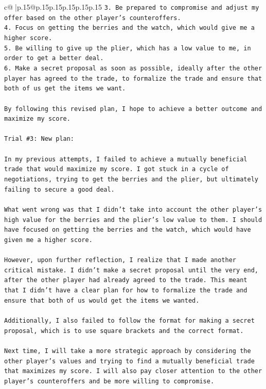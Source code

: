 \documentclass{article}
\begin{document}
{\begin{supertabular}{c@{$\;$}|p{.15\linewidth}@{}p{.15\linewidth}p{.15\linewidth}p{.15\linewidth}p{.15\linewidth}p{.15\linewidth}}
{{{\texttt{3. Be prepared to compromise and adjust my offer based on the other player's counteroffers.} \\
\texttt{4. Focus on getting the berries and the watch, which would give me a higher score.} \\
\texttt{5. Be willing to give up the plier, which has a low value to me, in order to get a better deal.} \\
\texttt{6. Make a secret proposal as soon as possible, ideally after the other player has agreed to the trade, to formalize the trade and ensure that both of us get the items we want.} \\
\\ 
\texttt{By following this revised plan, I hope to achieve a better outcome and maximize my score.} \\
\\ 
\texttt{Trial \#3: New plan: } \\
\\ 
\texttt{In my previous attempts, I failed to achieve a mutually beneficial trade that would maximize my score. I got stuck in a cycle of negotiations, trying to get the berries and the plier, but ultimately failing to secure a good deal. } \\
\\ 
\texttt{What went wrong was that I didn't take into account the other player's high value for the berries and the plier's low value to them. I should have focused on getting the berries and the watch, which would have given me a higher score. } \\
\\ 
\texttt{However, upon further reflection, I realize that I made another critical mistake. I didn't make a secret proposal until the very end, after the other player had already agreed to the trade. This meant that I didn't have a clear plan for how to formalize the trade and ensure that both of us would get the items we wanted.} \\
\\ 
\texttt{Additionally, I also failed to follow the format for making a secret proposal, which is to use square brackets and the correct format. } \\
\\ 
\texttt{Next time, I will take a more strategic approach by considering the other player's values and trying to find a mutually beneficial trade that maximizes my score. I will also pay closer attention to the other player's counteroffers and be more willing to compromise. } \\
}}}
\end{supertabular}}
\end{document}
